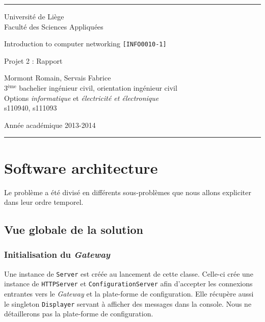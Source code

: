 \documentclass[a4paper,11pt]{article}
\begin{document}
\rule{1\linewidth}{1px}
{ \sc
\begin{center}
{\small Université de Liège}\\
{\small Faculté des Sciences Appliquées}

\end{center}

\vfill
\begin{center}

{\Huge Introduction to computer networking {\LARGE \tt [INFO0010-1]}\\}
\end{center}
\begin{center}
{\Huge Projet 2 : Rapport}
\end{center}
\begin{center}
Mormont Romain, Servais Fabrice\\
{\small 3$^{\text{ème}}$  bachelier ingénieur civil, orientation ingénieur civil}\\
{\small Options \textit{informatique} et \textit{électricité et électronique}}\\
{\small s110940, s111093}
\end{center}

\vfill
\begin{center}
Année académique 2013-2014\\
\end{center}
}
\rule{1\linewidth}{1px}
\newpage
\tableofcontents
\newpage
\section{Software architecture}
Le problème a été divisé en différents sous-problèmes que nous allons expliciter dans leur ordre temporel.

	\subsection{Vue globale de la solution}

	\subsubsection{Initialisation du \textit{Gateway}}
Une instance de \texttt{Server} est créée au lancement de cette classe. Celle-ci crée une instance de \texttt{HTTPServer} et \texttt{ConfigurationServer} afin d'accepter les connexions entrantes vers le \textit{Gateway} et la plate-forme de configuration. Elle récupère aussi le singleton \texttt{Displayer} servant à afficher des messages dans la console. Nous ne détaillerons pas la plate-forme de configuration.
\end{document}
